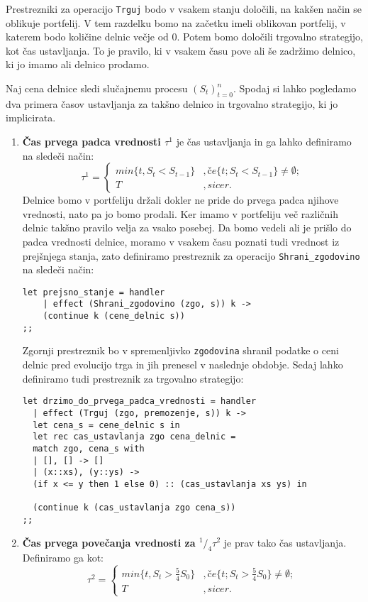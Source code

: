 \documentclass[a4paper,12pt]{article}
\theoremstyle{definition} %
\begin{document}
Prestrezniki za operacijo \lstinline{Trguj} bodo v vsakem stanju določili, na kakšen način se oblikuje portfelij. V tem razdelku bomo na začetku imeli oblikovan portfelij, v katerem bodo količine delnic večje od $0$. Potem bomo določili trgovalno strategijo, kot čas ustavljanja\cite{finMath}. To je pravilo, ki v vsakem času pove ali še zadržimo delnico, ki jo imamo ali delnico prodamo. 

Naj cena delnice sledi slučajnemu procesu $(S_t)_{t = 0}^n$. Spodaj si lahko pogledamo dva primera časov ustavljanja za takšno delnico in trgovalno strategijo, ki jo implicirata.

\begin{enumerate}
\item \textbf{Čas prvega padca vrednosti $\tau^1$} je čas ustavljanja in ga lahko definiramo na sledeči način:
\[  \tau^1 =   \left\{ \begin{array}{ll}
         min \{t, S_t < S_{t-1} \}  &, če\{t; S_t < S_{t-1}  \} \neq \emptyset ;\\
         T &, sicer.\end{array} \right. \]      
Delnice bomo v portfeliju držali dokler ne pride do prvega padca njihove vrednosti, nato pa jo bomo prodali. Ker imamo v portfeliju več različnih delnic takšno pravilo velja za vsako posebej. Da bomo vedeli ali je prišlo do padca vrednosti delnice, moramo v vsakem času poznati tudi vrednost iz prejšnjega stanja, zato definiramo prestreznik za operacijo \lstinline{Shrani_zgodovino} na sledeči način:
\begin{lstlisting}
let prejsno_stanje = handler
    | effect (Shrani_zgodovino (zgo, s)) k ->
    (continue k (cene_delnic s))
;;
\end{lstlisting}
Zgornji prestreznik bo v spremenljivko \lstinline{zgodovina} shranil podatke o ceni delnic pred evolucijo trga in jih prenesel v naslednje obdobje. Sedaj lahko definiramo tudi prestreznik za trgovalno strategijo:
\begin{lstlisting}
let drzimo_do_prvega_padca_vrednosti = handler
  | effect (Trguj (zgo, premozenje, s)) k ->
  let cena_s = cene_delnic s in
  let rec cas_ustavlanja zgo cena_delnic =
  match zgo, cena_s with
  | [], [] -> []
  | (x::xs), (y::ys) -> 
  (if x <= y then 1 else 0) :: (cas_ustavlanja xs ys) in

  (continue k (cas_ustavlanja zgo cena_s))
;;
\end{lstlisting}
\item \textbf{Čas prvega povečanja vrednosti za ${}^1/_4 \tau^2$} je prav tako čas ustavljanja. Definiramo ga kot:
\[  \tau^2 =   \left\{ \begin{array}{ll}
         min \{t, S_t > \frac{5}{4}S_0  \}  &, če\{t; S_t > \frac{5}{4}S_0  \} \neq \emptyset ;\\
         T &, sicer.\end{array} \right. \]
\end{enumerate}
\end{document}
